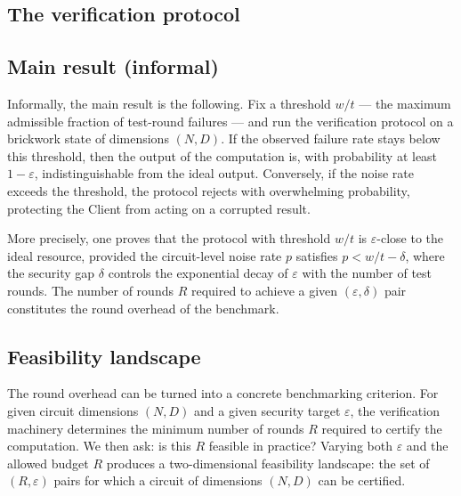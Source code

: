 \documentclass[]{article}
\begin{document}
\subsection{The verification protocol}
\label{subsec:protocol}


\subsection{Main result (informal)}
\label{subsec:result}

Informally, the main result is the following. Fix a threshold $w/t$ --- the
maximum admissible fraction of test-round failures --- and run the verification
protocol on a brickwork state of dimensions $(N, D)$. If the observed failure
rate stays below this threshold, then the output of the computation is, with
probability at least $1 - \varepsilon$, indistinguishable from the ideal
output. Conversely, if the noise rate exceeds the threshold, the protocol
rejects with overwhelming probability, protecting the Client from acting on a
corrupted result.

More precisely, one proves that the protocol with threshold $w/t$ is
$\varepsilon$-close to the ideal resource, provided the circuit-level noise
rate $p$ satisfies $p < w/t - \delta$, where the security gap $\delta$
controls the exponential decay of $\varepsilon$ with the number of test rounds.
The number of rounds $R$ required to achieve a given $(\varepsilon, \delta)$
pair constitutes the round overhead of the benchmark.

\subsection{Feasibility landscape}
\label{subsec:landscape}

The round overhead can be turned into a concrete benchmarking criterion. For
given circuit dimensions $(N, D)$ and a given security target $\varepsilon$,
the verification machinery determines the minimum number of rounds $R$ required
to certify the computation. We then ask: is this $R$ feasible in practice?
Varying both $\varepsilon$ and the allowed budget $R$ produces a
two-dimensional feasibility landscape: the set of $(R, \varepsilon)$ pairs for
which a circuit of dimensions $(N, D)$ can be certified.
\end{document}
